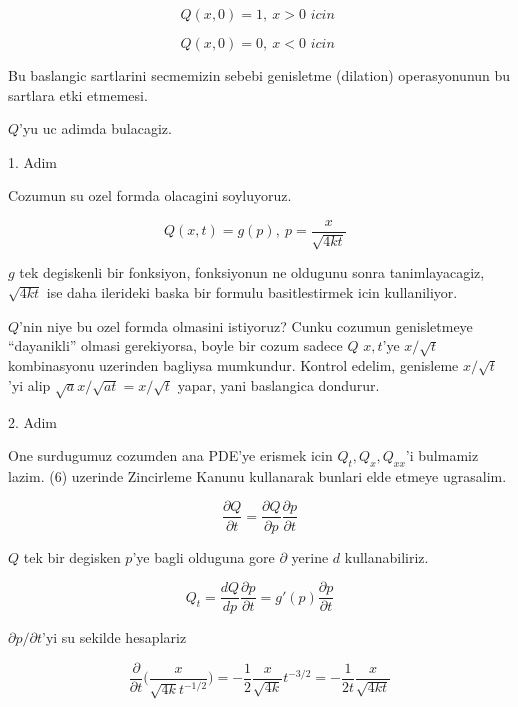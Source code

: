 \documentclass[12pt,fleqn]{article}
\begin{document}
\[ Q(x,0) = 1, \ x>0 \textit{ icin } \]

\[ Q(x,0)=0, \ x<0 \textit{ icin }  \]

Bu baslangic sartlarini secmemizin sebebi genisletme (dilation)
operasyonunun bu sartlara etki etmemesi. 

$Q$'yu uc adimda bulacagiz. 

1. Adim

Cozumun su ozel formda olacagini soyluyoruz. 

\[ Q(x,t) = g(p), \ p = \frac{x}{\sqrt{4kt}} \ \ \ \label{6} \]


$g$ tek degiskenli bir fonksiyon, fonksiyonun ne oldugunu sonra
tanimlayacagiz, $\sqrt{4kt}$ ise daha ilerideki baska bir formulu
basitlestirmek icin kullaniliyor. 

$Q$'nin niye bu ozel formda olmasini istiyoruz? Cunku cozumun genisletmeye
``dayanikli'' olmasi gerekiyorsa, boyle bir cozum sadece $Q$ $x,t$'ye
$x/\sqrt{t}$ kombinasyonu uzerinden bagliysa mumkundur. Kontrol edelim,
genisleme $x/\sqrt{t}$'yi alip $\sqrt{a}x/\sqrt{at} = x/\sqrt{t}$ yapar,
yani baslangica dondurur. 

2. Adim

One surdugumuz cozumden ana PDE'ye erismek icin $Q_t,Q_{x},Q_{xx}$'i
bulmamiz lazim. (6) uzerinde Zincirleme Kanunu kullanarak bunlari elde
etmeye ugrasalim. 

\[ \frac{\partial Q}{\partial t} = 
\frac{\partial Q}{\partial p}\frac{\partial p}{\partial t}
\]

$Q$ tek bir degisken $p$'ye bagli olduguna gore $\partial$ yerine $d$
kullanabiliriz. 

\[ Q_t = 
\frac{dQ}{dp}\frac{\partial p}{\partial t}  = 
g'(p)\frac{\partial p}{\partial t} 
\]

$\partial p/\partial t$'yi su sekilde hesaplariz

\[ 
\frac{\partial }{\partial t}
\bigg( 
\frac{x}{\sqrt{4k} t ^{-1/2}}
\bigg) = 
-\frac{1}{2} \frac{x}{\sqrt{4k}} t ^{-3/2} = 
-\frac{1}{2t} \frac{x}{\sqrt{4kt}}
 \]
\end{document}
